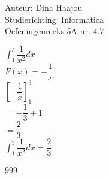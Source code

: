 \documentclass[a4paper]{article}
\begin{document}
\normalsize

\noindent \large Auteur: Dina Haajou \\
\noindent \large Studierichting: Informatica \\
\noindent \large Oefeningenreeks 5A nr. 4.7 \\

\medskip

\normalsize

$\displaystyle \int_1^3 \dfrac{1}{x^2} dx$ \\

$F(x) = -\dfrac{1}{x}$ \\

$\left[ -\dfrac{1}{x} \right]_1^3$ \\

$= -\dfrac{1}{3} + 1$ \\

$= \dfrac{2}{3}$ \\

$\displaystyle \int_1^3 \dfrac{1}{x^2} dx = \dfrac{2}{3}$ \\

\begin{thebibliography}{999}
\end{thebibliography}
\end{document}

